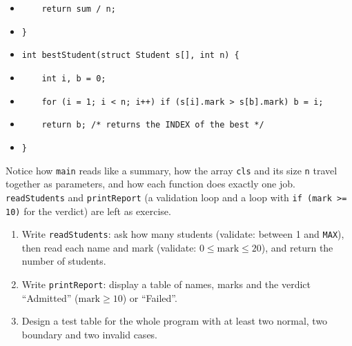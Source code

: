 \documentclass[11pt]{article}
\begin{document}
\begin{exemplebox}
\begin{itemize}
\item[] \texttt{\ \ \ \ return sum / n;}
\item[] \texttt{\}}
\item[] \texttt{int bestStudent(struct Student s[], int n) \{}
\item[] \texttt{\ \ \ \ int i, b = 0;}
\item[] \texttt{\ \ \ \ for (i = 1; i < n; i++) if (s[i].mark > s[b].mark) b = i;}
\item[] \texttt{\ \ \ \ return b;   /* returns the INDEX of the best */}
\item[] \texttt{\}}
\end{itemize}
Notice how \texttt{main} reads like a summary, how the array \texttt{cls} and its size \texttt{n} travel together as parameters, and how each function does exactly one job. \texttt{readStudents} and \texttt{printReport} (a validation loop and a loop with \texttt{if (mark >= 10)} for the verdict) are left as exercise.
\end{exemplebox}

\begin{exercice}
\begin{enumerate}
\item Write \texttt{readStudents}: ask how many students (validate: between 1 and \texttt{MAX}), then read each name and mark (validate: $0 \le \text{mark} \le 20$), and return the number of students.
\item Write \texttt{printReport}: display a table of names, marks and the verdict ``Admitted'' ($\text{mark} \ge 10$) or ``Failed''.
\item Design a test table for the whole program with at least two normal, two boundary and two invalid cases.
\end{enumerate}
\end{exercice}
\end{document}
